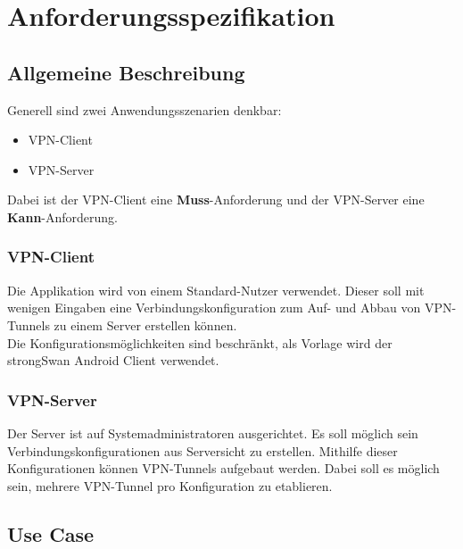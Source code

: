 \section{Anforderungsspezifikation}
\subsection{Allgemeine Beschreibung}
Generell sind zwei Anwendungsszenarien denkbar:
\begin{itemize}
	\item VPN-Client
	\item VPN-Server
\end{itemize}
\medskip
Dabei ist der VPN-Client eine \textbf{Muss}-Anforderung und der VPN-Server eine \textbf{Kann}-Anforderung.
\medskip
\subsubsection{VPN-Client}
Die Applikation wird von einem Standard-Nutzer verwendet. Dieser soll mit wenigen Eingaben eine Verbindungskonfiguration zum Auf- und Abbau von VPN-Tunnels zu einem Server erstellen können. \\
Die Konfigurationsmöglichkeiten sind beschränkt, als Vorlage wird der strongSwan Android Client verwendet.\\


\subsubsection{VPN-Server}
Der Server ist auf Systemadministratoren ausgerichtet. Es soll möglich sein Verbindungskonfigurationen aus Serversicht zu erstellen. Mithilfe dieser Konfigurationen können VPN-Tunnels aufgebaut werden. Dabei soll es möglich sein, mehrere VPN-Tunnel pro Konfiguration zu etablieren.

\subsection{Use Case}



